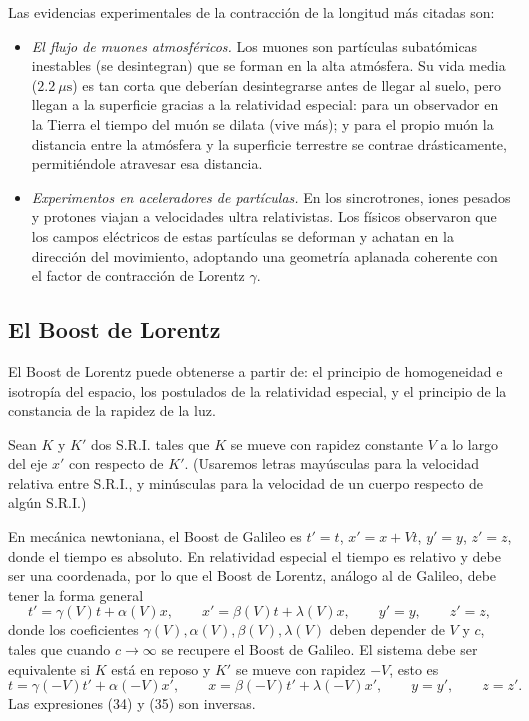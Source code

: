 \begin{observacion}
Las evidencias experimentales de la contracción de la longitud más
citadas son:
\begin{itemize}
\item \emph{El flujo de muones atmosféricos.} Los muones son partículas
subatómicas inestables (se desintegran) que se forman en la alta
atmósfera. Su vida media ($2.2\ \mu\text{s}$) es tan corta que deberían
desintegrarse antes de llegar al suelo, pero llegan a la superficie
gracias a la relatividad especial: para un observador en la Tierra el
tiempo del muón se dilata (vive más); y para el propio muón la distancia
entre la atmósfera y la superficie terrestre se contrae drásticamente,
permitiéndole atravesar esa distancia.
\item \emph{Experimentos en aceleradores de partículas.} En los
sincrotrones, iones pesados y protones viajan a velocidades ultra
relativistas. Los físicos observaron que los campos eléctricos de estas
partículas se deforman y achatan en la dirección del movimiento,
adoptando una geometría aplanada coherente con el factor de contracción
de Lorentz $\gamma$.
\end{itemize}
\end{observacion}

\subsection{El Boost de Lorentz}

El Boost de Lorentz puede obtenerse a partir de: el principio de
homogeneidad e isotropía del espacio, los postulados de la relatividad
especial, y el principio de la constancia de la rapidez de la luz.

Sean $K$ y $K'$ dos S.R.I. tales que $K$ se mueve con rapidez
constante $V$ a lo largo del eje $x'$ con respecto de $K'$. (Usaremos letras mayúsculas
para la velocidad relativa entre S.R.I., y minúsculas para la velocidad
de un cuerpo respecto de algún S.R.I.)

En mecánica newtoniana, el Boost de Galileo es $t'=t$, $x'=x+Vt$,
$y'=y$, $z'=z$, donde el tiempo es absoluto. En relatividad especial el
tiempo es relativo y debe ser una coordenada, por lo que el Boost de
Lorentz, análogo al de Galileo, debe tener la forma general
\[
t' = \gamma(V)t + \alpha(V)x, \qquad x' = \beta(V)t+\lambda(V)x, \qquad
y'=y, \qquad z'=z, \tag{34}
\]
donde los coeficientes $\gamma(V),\alpha(V),\beta(V),\lambda(V)$ deben
depender de $V$ y $c$, tales que cuando $c\to\infty$ se recupere el
Boost de Galileo. El sistema debe ser equivalente si $K$ está en reposo
y $K'$ se mueve con rapidez $-V$, esto es
\[
t = \gamma(-V)t'+\alpha(-V)x', \qquad x=\beta(-V)t'+\lambda(-V)x',
\qquad y=y', \qquad z=z'. \tag{35}
\]
Las expresiones (34) y (35) son inversas.

